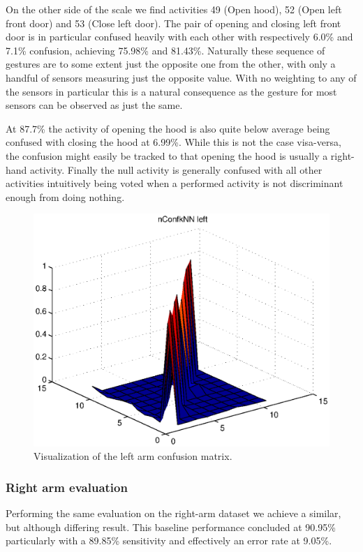 \documentclass{sig-alternate}
\begin{document}
On the other side of the scale we find activities 49 (Open hood), 52 (Open left front door) and 53 (Close left door). The pair of opening and closing left front door is in particular confused heavily with each other with respectively 6.0\% and 7.1\% confusion, achieving 75.98\% and 81.43\%. Naturally these sequence of gestures are to some extent just the opposite one from the other, with only a handful of sensors measuring just the opposite value. With no weighting to any of the sensors in particular this is a natural consequence as the gesture for most sensors can be observed as just the same.

At 87.7\% the activity of opening the hood is also quite below average being confused with closing the hood at 6.99\%. While this is not the case visa-versa, the confusion might easily be tracked to that opening the hood is usually a right-hand activity. Finally the null activity is generally confused with all other activities intuitively being voted when a performed activity is not discriminant enough from doing nothing.

\begin{figure}[bp]
  \centering
  \includegraphics[scale=0.4]{./matlab_output/nConfkNN_left.eps}
  \caption{Visualization of the left arm confusion matrix.}
  \label{fig:conf_left_surf}
\end{figure}

\subsubsection{Right arm evaluation}
Performing the same evaluation on the right-arm dataset we achieve a similar, but although differing result. This baseline performance concluded at 90.95\% particularly with a 89.85\% sensitivity and effectively an error rate at 9.05\%.
\end{document}

